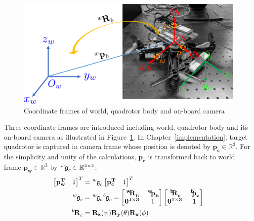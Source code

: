 \begin{figure}[htb]
  \centering
  \includegraphics[width=1.0\textwidth]{figure/chapter_2/coordinate.png}
  \caption{Coordinate frames of world, quadrotor body and on-board camera}
  \label{fig:coordinate}
\end{figure}
Three coordinate frames are introduced including world, quadrotor body and its on-board camera as illustrated in Figure~\ref{fig:coordinate}. In Chapter~\ref{implementation}, target quadrotor is captured in camera frame whose position is denoted by $\mathbf{p_c}\in\mathbb{R}^3$. For the simplicity and unity of the calculations, $\mathbf{p_c}$ is transformed back to world frame $\mathbf{p_w}\in\mathbb{R}^3$ by $\tensor*[^w]{\mathfrak{g}}{_c}\in\mathbb{R}^{4\times4}$:
\begin{equation}\label{eq:transform}
\begin{aligned}
\begin{bmatrix}\mathbf{p^T_w}&1\end{bmatrix}^T&=\tensor*[^w]{\mathfrak{g}}{_c}\begin{bmatrix}\mathbf{p^T_c}&1\end{bmatrix}^T\\
\tensor*[^w]{\mathfrak{g}}{_c}&=\tensor*[^w]{\mathfrak{g}}{_b}\tensor*[^b]{\mathfrak{g}}{_c}=\begin{bmatrix}\mathbf{\tensor*[^w]{R}{_b}}&\mathbf{\tensor*[^w]{p}{_b}}\\\mathbf{0^{1\times3}}&1\end{bmatrix}
\begin{bmatrix}\mathbf{\tensor*[^b]{R}{_c}}&\mathbf{\tensor*[^b]{p}{_c}}\\\mathbf{0^{1\times3}}&1\end{bmatrix}\\
\tensor*[^b]{\mathbf{R}}{_c}&=\mathbf{R_z}(\psi)\mathbf{R_y}(\theta)\mathbf{R_x}(\phi)
\end{aligned}
\end{equation}
